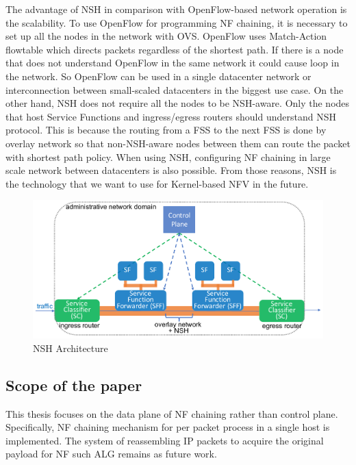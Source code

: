 \begin{itemize}
			The advantage of NSH in comparison with OpenFlow-based network operation is the scalability. To use OpenFlow for programming NF chaining, it is necessary to set up all the nodes in the network with OVS. OpenFlow uses Match-Action flowtable which directs packets regardless of the shortest path. If there is a node that does not understand OpenFlow in the same network it could cause loop in the network. So OpenFlow can be used in a single datacenter network or interconnection between small-scaled datacenters in the biggest use case. On the other hand, NSH does not require all the nodes to be NSH-aware. Only the nodes that host Service Functions and ingress/egress routers should understand NSH protocol. This is because the routing from a FSS to the next FSS is done by overlay network so that non-NSH-aware nodes between them can route the packet with shortest path policy. When using NSH, configuring NF chaining in large scale network between datacenters is also possible. From those reasons, NSH is the technology that we want to use for Kernel-based NFV in the future. 
	\end{itemize}
	
\begin{figure}[t]
	\centering
	\includegraphics[width=120mm]{pics/NSH.pdf}
	\caption{NSH Architecture}
	\label{fig: NSH}
\end{figure}

\subsection{Scope of the paper}
This thesis focuses on the data plane of NF chaining rather than control plane.  Specifically, NF chaining mechanism for per packet process in a single host is implemented. The system of reassembling IP packets to acquire the original payload for NF such ALG remains as future work. 










